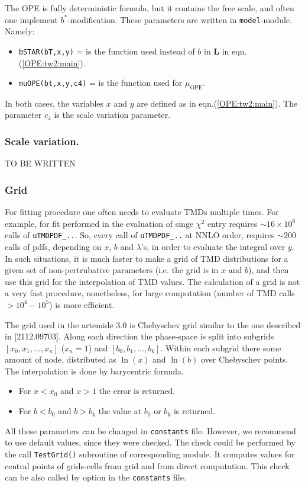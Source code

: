 \documentclass[prd,nofootinbib,eqsecnum,final]{revtex4}
\renewcommand{\(}{\left(}
\renewcommand{\)}{\right)}
\renewcommand{\[}{\left[}
\renewcommand{\]}{\right]}
\begin{document}
The OPE is fully deterministic formula, but it contains the free scale, and often one implement $b^*$-modification. These parameters are written in \texttt{model}-module. Namely:
\begin{itemize}
\item \texttt{bSTAR(bT,x,y)} = is the function used instead of $b$ in  $\mathbf{L}$ in eqn.(\ref{OPE:tw2:main}).
\item \texttt{muOPE(bt,x,y,c4)} = is the function used for $\mu_{\text{OPE}}$.
\end{itemize}
In both cases, the variables $x$ and $y$ are defined as in eqn.(\ref{OPE:tw2:main}). The parameter $c_4$ is the scale variation parameter.

\subsubsection{Scale variation.} 

TO BE WRITTEN

\subsubsection{Grid}
\label{sec:OPE:grid1}

For fitting procedure one often needs to evaluate TMDs multiple times. For example, for fit performed in \cite{Scimemi:2017etj} the evaluation of singe $\chi^2$ entry requires $\sim 16\times 10^6$ calls of \texttt{uTMDPDF{\_}..}. So, every call of \texttt{uTMDPDF{\_}..} at NNLO order, requires $\sim 200$ calls of pdfs, depending on $x$, $b$ and $\lambda$'s, in order to evaluate the integral over $y$. In such situations, it is much faster to make a grid of TMD distributions for a given set of non-pertrubative parameters (i.e. the grid is in $x$ and $b$), and then use this grid for the interpolation of TMD values. The calculation of a grid is not a very fast procedure, nonetheless, for large computation (number of TMD calls $>10^4-10^5$) is more efficient.

The grid used in the artemide 3.0 is Chebyschev grid similar to the one described in [2112.09703]. Along each direction the phase-space is split into subgrids
$[x_0,x_1,...,x_{n}]$ ($x_n=1$) and $[b_0,b_1,...,b_k]$. Within each subgrid there some amount of node, distributed as $\ln(x)$ and $\ln(b)$ over Chebyschev points. The interpolation is done by barycentric formula.
\begin{itemize}
\item For $x<x_0$ and $x>1$ the error is returned.
\item For $b<b_0$ and $b>b_k$ the value at $b_0$ or $b_k$ is returned.
\end{itemize}
All these parameters can be changed in \texttt{constants} file.  However, we recommend to use default values, since they were checked. The check could be performed by the call \texttt{TestGrid()} subroutine of corresponding module. It computes values for central points of grids-cells from grid and from direct computation. This check can be also called by option in the \texttt{constants} file.
\end{document}
